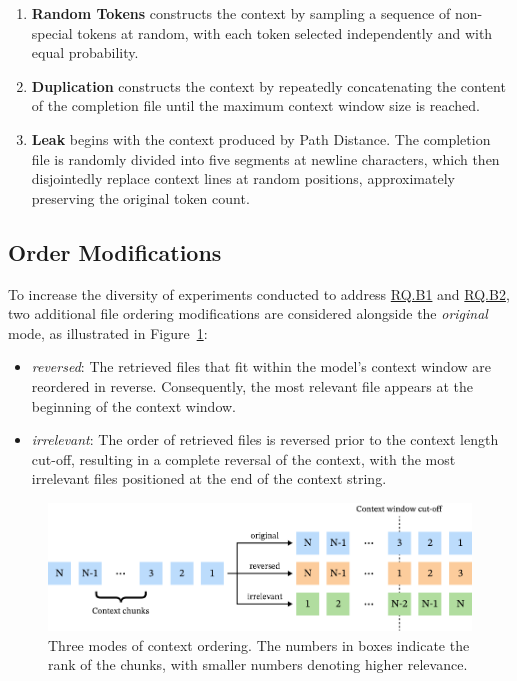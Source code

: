 \begin{enumerate}
    \item \textbf{Random Tokens} constructs the context by sampling a sequence of non-special tokens at random, with each token selected independently and with equal probability.
    \item \textbf{Duplication} constructs the context by repeatedly concatenating the content of the completion file until the maximum context window size is reached.
    \item \textbf{Leak} begins with the context produced by Path Distance. The completion file is randomly divided into five segments at newline characters, which then disjointedly replace context lines at random positions, approximately preserving the original token count.
\end{enumerate}\parencite{sapronov2025} %

\subsection{Order Modifications}

To increase the diversity of experiments conducted to address \hyperref[rq:rq-b1]{RQ.B1} and \hyperref[rq:rq-b2]{RQ.B2}, two additional file ordering modifications are considered alongside the \textit{original} mode, as illustrated in Figure~\ref{fig:order-modes}:

\begin{itemize}
    \item \textit{reversed}: The retrieved files that fit within the model's context window are reordered in reverse. Consequently, the most relevant file appears at the beginning of the context window.
    \item \textit{irrelevant}: The order of retrieved files is reversed prior to the context length cut-off, resulting in a complete reversal of the context, with the most irrelevant files positioned at the end of the context string.
\end{itemize}

\begin{figure}[ht]
    \centering
    \includegraphics[width=\textwidth]{figures/order-modes.pdf}
    \caption{Three modes of context ordering. The numbers in boxes indicate the rank of the chunks, with smaller numbers denoting higher relevance.}\label{fig:order-modes}
\end{figure}

